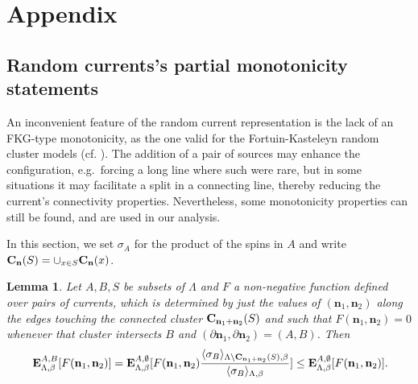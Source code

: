 \documentclass[a4paper,oneside,11pt]{article}
\newtheorem{lemma}[theorem]{Lemma}
\numberwithin{equation}{section}
\numberwithin{equation}{section}
\numberwithin{equation}{section}
\newcommand{\n}{\mathbf{n}}
\begin{document}
\appendix
\section{Appendix}


\subsection{Random currents's partial monotonicity statements}

An inconvenient feature of the random  current representation is the  lack of an FKG-type monotonicity, as the one  valid for the Fortuin-Kasteleyn random cluster models (cf. \cite{Gri06}).     The addition of a pair of  sources may  enhance the configuration, e.g.~forcing a long line where such were rare, but in some situations it may facilitate a split in a connecting line, thereby reducing the current's connectivity properties.    
Nevertheless, some monotonicity properties can still be found, and are used in our analysis.

In this section, we set $\sigma_A$ for the product of the spins in $A$ and write ${\bf C}_\n(S)=\cup_{x\in S}{\bf C}_\n(x)$. 

\begin{lemma}\label{lem:a}  
Let $A,B,S$ be subsets of $\Lambda$ and $F$ a non-negative function defined over pairs of currents, which is determined by just the values of $(\n_1,\n_2)$ along the edges touching the connected cluster ${\bf C}_{\n_1+\n_2}(S) $ and such that $F(\n_1,\n_2)=0$ whenever that cluster intersects $B$ and $(\partial\n_1,\partial \n_2)=(A,B)$.  
Then
\begin{eqnarray}\label{eq:mm}
\,{\bf E}^{A,B}_{\Lambda,\beta}[F(\n_1,\n_2)] ={\bf E}^{A,\emptyset}_{\Lambda,\beta}[F(\n_1,\n_2)\frac{\langle\sigma_B\rangle_{\Lambda\setminus{\bf C}_{\n_1+\n_2}(S),\beta}}{\langle\sigma_B\rangle_{\Lambda,\beta}}] \leq  {\bf E}^{A,\emptyset}_{\Lambda,\beta}[F(\n_1,\n_2)].
\end{eqnarray}
\end{lemma}
\end{document}
